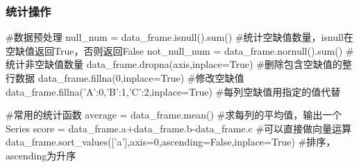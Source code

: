     \subsubsection{统计操作}
      \begin{codeblock}[language=python, caption={Perform statistical operations using DataFrame}]
        #数据预处理
        null_num = data_frame.isnull().sum() #统计空缺值数量，isnull在空缺值返回True，否则返回False
        not_null_num = data_frame.nornull().sum() #统计非空缺值数量
        data_frame.dropna(axis,inplace=True) #删除包含空缺值的整行数据
        data_frame.fillna(0,inplace=True) #修改空缺值
        data_frame.fillna({'A':0,'B':1,'C':2},inplace=True) #每列空缺值用指定的值代替

        #常用的统计函数
        average = data_frame.mean() #求每列的平均值，输出一个Series
        score = data_frame.a+data_frame.b-data_frame.c #可以直接做向量运算
        data_frame.sort_values(['a'],axis=0,ascending=False,inplace=True) #排序，ascending为升序
      \end{codeblock}

